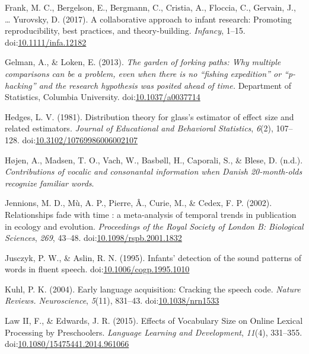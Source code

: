 \documentclass[man]{apa6}
\theoremstyle{definition}
\theoremstyle{definition}
\theoremstyle{definition}
\theoremstyle{remark}
\begin{document}
\hypertarget{ref-Frank2017}{}
Frank, M. C., Bergelson, E., Bergmann, C., Cristia, A., Floccia, C.,
Gervain, J., \ldots{} Yurovsky, D. (2017). A collaborative approach to
infant research: Promoting reproducibility, best practices, and
theory-building. \emph{Infancy}, 1--15.
doi:\href{https://doi.org/10.1111/infa.12182}{10.1111/infa.12182}

\hypertarget{ref-Gelman2013}{}
Gelman, A., \& Loken, E. (2013). \emph{The garden of forking paths: Why
multiple comparisons can be a problem, even when there is no ``fishing
expedition'' or ``p-hacking'' and the research hypothesis was posited
ahead of time.} Department of Statistics, Columbia University.
doi:\href{https://doi.org/10.1037/a0037714}{10.1037/a0037714}

\hypertarget{ref-Hedges1981}{}
Hedges, L. V. (1981). Distribution theory for glass's estimator of
effect size and related estimators. \emph{Journal of Educational and
Behavioral Statistics}, \emph{6}(2), 107--128.
doi:\href{https://doi.org/10.3102/10769986006002107}{10.3102/10769986006002107}

\hypertarget{ref-Hojen}{}
Højen, A., Madsen, T. O., Vach, W., Basbøll, H., Caporali, S., \& Blese,
D. (n.d.). \emph{Contributions of vocalic and consonantal information
when Danish 20-month-olds recognize familiar words}.

\hypertarget{ref-Jennions2002}{}
Jennions, M. D., Mù, A. P., Pierre, Â., Curie, M., \& Cedex, F. P.
(2002). Relationships fade with time : a meta-analysis of temporal
trends in publication in ecology and evolution. \emph{Proceedings of the
Royal Society of London B: Biological Sciences}, \emph{269}, 43--48.
doi:\href{https://doi.org/10.1098/rspb.2001.1832}{10.1098/rspb.2001.1832}

\hypertarget{ref-Jusczyk1995}{}
Jusczyk, P. W., \& Aslin, R. N. (1995). Infants' detection of the sound
patterns of words in fluent speech.
doi:\href{https://doi.org/10.1006/cogp.1995.1010}{10.1006/cogp.1995.1010}

\hypertarget{ref-Kuhl2004}{}
Kuhl, P. K. (2004). Early language acquisition: Cracking the speech
code. \emph{Nature Reviews. Neuroscience}, \emph{5}(11), 831--43.
doi:\href{https://doi.org/10.1038/nrn1533}{10.1038/nrn1533}

\hypertarget{ref-Law2015}{}
Law II, F., \& Edwards, J. R. (2015). Effects of Vocabulary Size on
Online Lexical Processing by Preschoolers. \emph{Language Learning and
Development}, \emph{11}(4), 331--355.
doi:\href{https://doi.org/10.1080/15475441.2014.961066}{10.1080/15475441.2014.961066}
\end{document}
